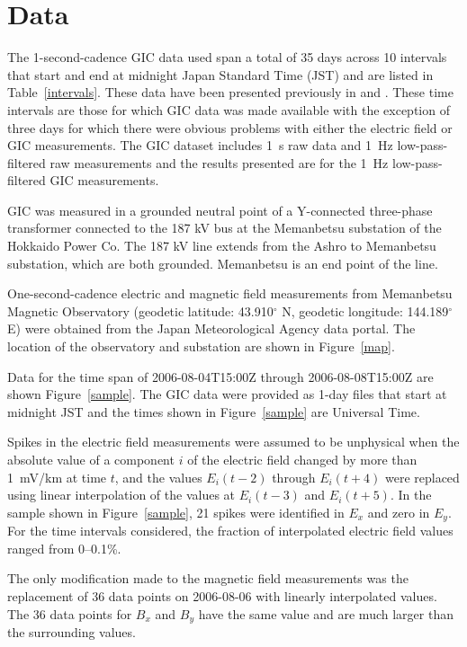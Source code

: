 \documentclass[draft,linenumbers]{agujournal2018}
\begin{document}
\section{Data}

The 1-second-cadence GIC data used span a total of 35 days across 10 intervals that start and end at midnight Japan Standard Time (JST) and are listed in Table~\ref{intervals}. These data have been presented previously in \citet{Watari2009} and \cite{Watari2015}. These time intervals are those for which GIC data was made available with the exception of three days for which there were obvious problems with either the electric field or GIC measurements. The GIC dataset includes 1~s raw data and 1~Hz low-pass-filtered raw measurements and the results presented are for the 1~Hz low-pass-filtered GIC measurements.

GIC was measured in a grounded neutral point of a Y-connected three-phase transformer connected to the 187 kV bus at the Memanbetsu substation of the Hokkaido Power Co. The 187 kV line extends from the Ashro to Memanbetsu substation, which are both grounded. Memanbetsu is an end point of the line.

One-second-cadence electric and magnetic field measurements from Memanbetsu Magnetic Observatory (geodetic latitude: 43.910$^{\circ}$ N, geodetic longitude: 144.189$^{\circ}$ E) were obtained from the Japan Meteorological Agency data portal. The location of the observatory and substation are shown in Figure~\ref{map}.

Data for the time span of 2006-08-04T15:00Z through 2006-08-08T15:00Z are shown Figure~\ref{sample}. The GIC data were provided as 1-day files that start at midnight JST and the times shown in Figure~\ref{sample} are Universal Time.

Spikes in the electric field measurements were assumed to be unphysical when the absolute value of a component $i$ of the electric field changed by more than 1~mV/km at time $t$, and the values $E_i(t-2)$ through $E_i(t+4)$ were replaced using linear interpolation of the values at $E_i(t-3)$ and $E_i(t + 5)$. In the sample shown in Figure~\ref{sample}, 21 spikes were identified in $E_x$ and zero in $E_y$. For the time intervals considered, the fraction of interpolated electric field values ranged from 0--0.1\%.

The only modification made to the magnetic field measurements was the replacement of 36 data points on 2006-08-06 with linearly interpolated values. The 36 data points for $B_x$ and $B_y$ have the same value and are much larger than the surrounding values.
\end{document}
